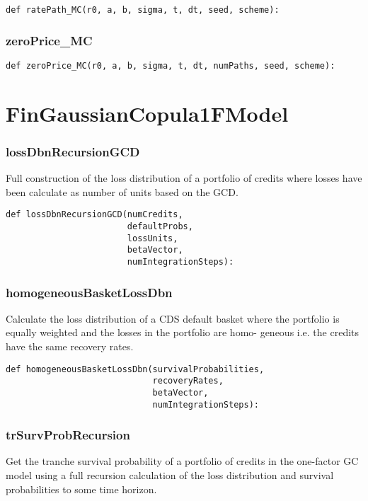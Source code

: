 \documentclass[twoside,11pt]{book}
\begin{document}
\begin{lstlisting}
def ratePath_MC(r0, a, b, sigma, t, dt, seed, scheme):
\end{lstlisting}

\subsubsection*{{\bf zeroPrice\_MC}}


\begin{lstlisting}
def zeroPrice_MC(r0, a, b, sigma, t, dt, numPaths, seed, scheme):
\end{lstlisting}

\newpage
\section{FinGaussianCopula1FModel}

\subsubsection*{{\bf lossDbnRecursionGCD}}
Full construction of the loss distribution of a portfolio of credits where losses have been calculate as number of units based on the GCD.  

\begin{lstlisting}
def lossDbnRecursionGCD(numCredits,
                        defaultProbs,
                        lossUnits,
                        betaVector,
                        numIntegrationSteps):
\end{lstlisting}

\subsubsection*{{\bf homogeneousBasketLossDbn}}
Calculate the loss distribution of a CDS default basket where the portfolio is equally weighted and the losses in the portfolio are homo- geneous i.e. the credits have the same recovery rates.  

\begin{lstlisting}
def homogeneousBasketLossDbn(survivalProbabilities,
                             recoveryRates,
                             betaVector,
                             numIntegrationSteps):
\end{lstlisting}

\subsubsection*{{\bf trSurvProbRecursion}}
Get the tranche survival probability of a portfolio of credits in the one-factor GC model using a full recursion calculation of the loss distribution and survival probabilities to some time horizon.  
\end{document}
